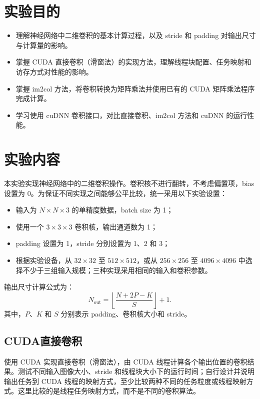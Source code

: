 \documentclass{SYSUReport}
\date{2026年6月11日}
\begin{document}
\cover
\thispagestyle{empty}
\clearpage

\section{实验目的}
\begin{itemize}
    \item 理解神经网络中二维卷积的基本计算过程，以及 stride 和 padding 对输出尺寸与计算量的影响。
    \item 掌握 CUDA 直接卷积（滑窗法）的实现方法，理解线程块配置、任务映射和访存方式对性能的影响。
    \item 掌握 im2col 方法，将卷积转换为矩阵乘法并使用已有的 CUDA 矩阵乘法程序完成计算。
    \item 学习使用 cuDNN 卷积接口，对比直接卷积、im2col 方法和 cuDNN 的运行性能。
\end{itemize}

\section{实验内容}
本实验实现神经网络中的二维卷积操作。卷积核不进行翻转，不考虑偏置项，bias 设置为 0。为保证不同实现之间能够公平比较，统一采用以下实验设置：
\begin{itemize}
    \item 输入为 $N\times N\times3$ 的单精度数据，batch size 为 1；
    \item 使用一个 $3\times3\times3$ 卷积核，输出通道数为 1；
    \item padding 设置为 1，stride 分别设置为 1、2 和 3；
    \item 根据实验设备，从 $32\times32$ 至 $512\times512$，或从 $256\times256$ 至 $4096\times4096$ 中选择不少于三组输入规模；三种实现采用相同的输入和卷积参数。
\end{itemize}
输出尺寸计算公式为：
\begin{equation*}
N_{\mathrm{out}}
=
\left\lfloor
\frac{N+2P-K}{S}
\right\rfloor
+1.
\end{equation*}
其中，$P$、$K$ 和 $S$ 分别表示 padding、卷积核大小和 stride。

\subsection{CUDA直接卷积}
使用 CUDA 实现直接卷积（滑窗法），由 CUDA 线程计算各个输出位置的卷积结果。测试不同输入图像大小、stride 和线程块大小下的运行时间；自行设计并说明输出任务到 CUDA 线程的映射方式，至少比较两种不同的任务粒度或线程映射方式。这里比较的是线程任务映射方式，而不是不同的卷积算法。
\end{document}
